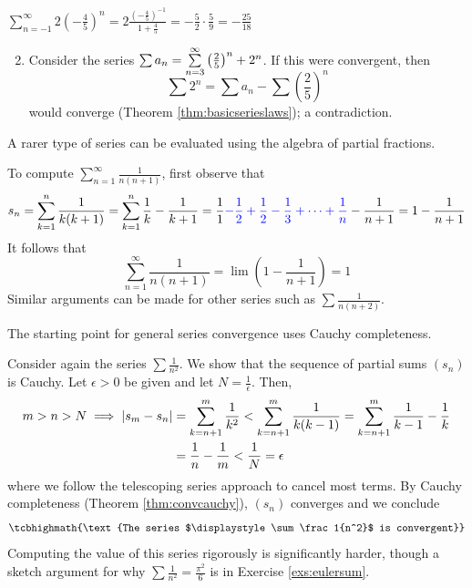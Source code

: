 \begin{examples}{}{}
	\exstart $\displaystyle \sum_{n=-1}^\infty 2\left(-\frac 45\right)^n= 2\frac{\left(-\frac 45\right)^{-1}}{1+\frac 45} =-\frac 52\cdot\frac 59= -\frac{25}{18}$
	\begin{enumerate}\setcounter{enumi}{1}
	  \item Consider the series $\sum a_n=\smash[b]{\sum\limits_{n=3}^\infty} \left(\frac 25\right)^n +2^n$. If this were convergent, then
		\[\sum 2^n=\sum a_n-\sum\left(\frac 25\right)^n\]
		would converge (Theorem \ref{thm:basicserieslaws}); a contradiction.
	\end{enumerate}
\end{examples}



A rarer type of series can be evaluated using the algebra of partial fractions.

\begin{example}{}{}
	To compute $\sum\limits_{n=1}^\infty\frac 1{n(n+1)}$, first  observe that
	\[s_n=\sum_{k=1}^n\frac 1{k(k+1)} =\sum_{k=1}^n\frac 1k-\frac 1{k+1} =\frac 11\textcolor{blue}{-\frac 12+\frac 12-\frac 13+\cdots+\frac 1n}-\frac 1{n+1}=1-\frac 1{n+1}\]
	It follows that
	\[\sum_{n=1}^\infty\frac 1{n(n+1)}=\lim \left(1-\frac 1{n+1}\right)=1\]
	Similar arguments can be made for other series such as $\sum\frac 1{n(n+2)}$.
\end{example}

\goodbreak



The starting point for general series convergence uses Cauchy completeness.

\begin{example}{}{}
	Consider again the series $\sum\frac 1{n^2}$. We show that the sequence of partial sums $(s_n)$ is Cauchy. Let $\epsilon>0$ be given and let $N=\frac 1\epsilon$. Then,
	\begin{align*}
	m>n>N\implies \left| s_m-s_n\right|&=\sum_{k=n+1}^m\frac 1{k^2}<\sum_{k=n+1}^m\frac 1{k(k-1)} =\sum_{k=n+1}^m\frac 1{k-1}-\frac 1k\\
	&=\frac 1n-\frac 1m<\frac 1N=\epsilon
	\end{align*}
	where we follow the telescoping series approach to cancel most terms. By Cauchy completeness (Theorem \ref{thm:convcauchy}), $(s_n)$ converges and we conclude
	\[
		\tcbhighmath{\text{The series $\displaystyle \sum\frac 1{n^2}$ is convergent}}
	\]
	Computing the value of this series rigorously is significantly harder, though a sketch argument for why $\sum\frac 1{n^2}=\frac{\pi^2}6$ is in Exercise \ref{exs:eulersum}.
\end{example}

